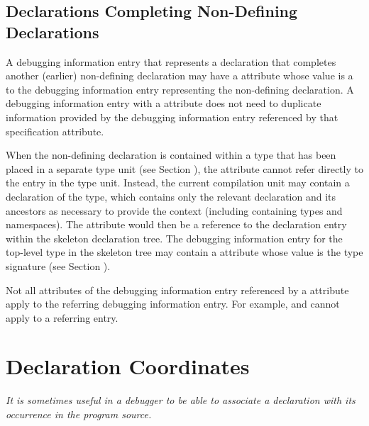 \subsection{Declarations Completing Non-Defining Declarations}
\hypertarget{chap:DWATspecificationincompletenondefiningorseparatedeclaration}{}
A debugging information entry that represents a declaration
that completes another (earlier) non-defining declaration may have a 
\DWATspecificationDEFN{}
attribute whose value is a  to
the debugging information entry representing the non-defining declaration. 
A debugging information entry with a 
\DWATspecificationNAME{} 
attribute does not need to duplicate information provided by the 
debugging information entry referenced by that specification attribute.

When the non-defining declaration is contained within a type that has
been placed in a separate type unit (see Section ), 
the \DWATspecification{} attribute cannot refer directly to the entry in
the type unit. Instead, the current compilation unit may contain a
 declaration of the type, which contains only the relevant
declaration and its ancestors as necessary to provide the context
(including containing types and namespaces). The \DWATspecification{}
attribute would then be a reference to the declaration entry within
the skeleton declaration tree. The debugging information entry for the
top-level type in the skeleton tree may contain a \DWATsignature{}
attribute whose value is the type signature 
(see Section ).

Not all attributes of the debugging information entry referenced by a
\DWATspecification{} attribute 
apply to the referring debugging information entry.
For
example,
\DWATsibling{} and 
\DWATdeclaration{} 
cannot apply to a 
referring
entry.


\section{Declaration Coordinates}
\label{chap:declarationcoordinates}
\textit{It is sometimes useful in a debugger to be able to associate
a declaration with its occurrence in the program source.}

